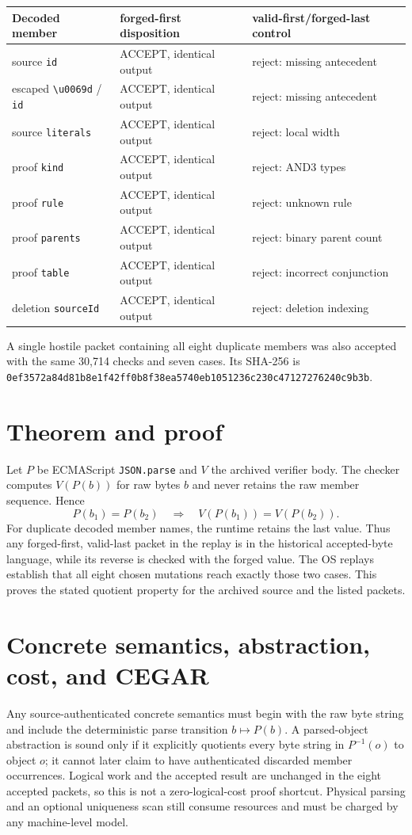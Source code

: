 \documentclass[11pt]{article}
\begin{document}
\begin{longtable}{lll}
\toprule
Decoded member & forged-first disposition & valid-first/forged-last control\\\midrule
source \texttt{id} & ACCEPT, identical output & reject: missing antecedent\\
escaped \texttt{\textbackslash u0069d} / \texttt{id} & ACCEPT, identical output & reject: missing antecedent\\
source \texttt{literals} & ACCEPT, identical output & reject: local width\\
proof \texttt{kind} & ACCEPT, identical output & reject: AND3 types\\
proof \texttt{rule} & ACCEPT, identical output & reject: unknown rule\\
proof \texttt{parents} & ACCEPT, identical output & reject: binary parent count\\
proof \texttt{table} & ACCEPT, identical output & reject: incorrect conjunction\\
deletion \texttt{sourceId} & ACCEPT, identical output & reject: deletion indexing\\
\bottomrule
\end{longtable}

A single hostile packet containing all eight duplicate members was also accepted with the same
30,714 checks and seven cases.  Its SHA-256 is
\texttt{0ef3572a84d81b8e1f42ff0b8f38ea5740eb1051236c230c47127276240c9b3b}.

\section{Theorem and proof}
Let $P$ be ECMAScript \texttt{JSON.parse} and $V$ the archived verifier body.  The checker computes
$V(P(b))$ for raw bytes $b$ and never retains the raw member sequence.  Hence
\[
  P(b_1)=P(b_2)\quad\Longrightarrow\quad V(P(b_1))=V(P(b_2)).
\]
For duplicate decoded member names, the runtime retains the last value.  Thus any forged-first,
valid-last packet in the replay is in the historical accepted-byte language, while its reverse is
checked with the forged value.  The OS replays establish that all eight chosen mutations reach
exactly those two cases.  This proves the stated quotient property for the archived source and the
listed packets.

\section{Concrete semantics, abstraction, cost, and CEGAR}
Any source-authenticated concrete semantics must begin with the raw byte string and include the
deterministic parse transition $b\mapsto P(b)$.  A parsed-object abstraction is sound only if it
explicitly quotients every byte string in $P^{-1}(o)$ to object $o$; it cannot later claim to have
authenticated discarded member occurrences.  Logical work and the accepted result are unchanged
in the eight accepted packets, so this is not a zero-logical-cost proof shortcut.  Physical parsing
and an optional uniqueness scan still consume resources and must be charged by any machine-level
model.
\end{document}
